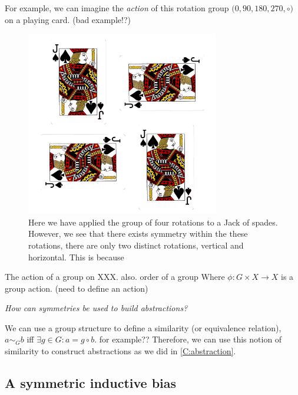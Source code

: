 For example, we can imagine the \textit{action} of this rotation group $\big(0, 90, 180, 270, \circ \big)$ on a playing card. (bad example!?)

\begin{figure}[h!]
	\centering
	\includegraphics[width=0.75\textwidth,height=0.5\textheight]{../../pictures/images/jacks.png}
	\caption{Here we have applied the group of four rotations to a Jack of spades.
	However, we see that there exists symmetry within the these rotations,
	there are only two distinct rotations, vertical and horizontal. This is because }
\end{figure}

{\color{red}The action of a group on XXX. also. order of a group}
Where $\phi: G \times X \to X$ is a group action. (need to define an action)

\begin{displayquote}
\textsl{How can symmetries be used to build abstractions?}
\end{displayquote}

We can use a group structure to define a similarity (or equivalence relation),
$a \sim_G b$ iff $\exists g \in G: a = g \circ b$. {\color{red} for example??} Therefore, we can use this
 notion of similarity to construct abstractions as we did in \ref{C:abstraction}.


\subsection{A symmetric inductive bias}

